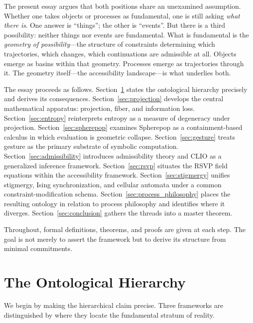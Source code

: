 \documentclass[12pt, a4paper, twoside]{article}
\theoremstyle{plain}
\theoremstyle{definition}
\theoremstyle{remark}
\begin{document}
The present essay argues that both positions share an unexamined assumption.
Whether one takes objects or processes as fundamental, one is still asking
\emph{what there is}. One answer is ``things''; the other is ``events''. But
there is a third possibility: neither things nor events are fundamental. What
is fundamental is the \emph{geometry of possibility}---the structure of
constraints determining which trajectories, which changes, which continuations
are admissible at all. Objects emerge as basins within that geometry. Processes
emerge as trajectories through it. The geometry itself---the accessibility
landscape---is what underlies both.

The essay proceeds as follows. Section~\ref{sec:ontological_hierarchy} states
the ontological hierarchy precisely and derives its consequences.
Section~\ref{sec:projection} develops the central mathematical apparatus:
projection, fiber, and information loss.
Section~\ref{sec:entropy} reinterprets entropy as a measure of degeneracy
under projection. Section~\ref{sec:spherepop} examines Spherepop as a
containment-based calculus in which evaluation is geometric collapse.
Section~\ref{sec:gesture} treats gesture as the primary substrate of symbolic
computation. Section~\ref{sec:admissibility} introduces admissibility theory
and CLIO as a generalized inference framework.
Section~\ref{sec:rsvp} situates the RSVP field equations within the
accessibility framework. Section~\ref{sec:stigmergy} unifies stigmergy, Ising
synchronization, and cellular automata under a common constraint-modification
schema. Section~\ref{sec:process_philosophy} places the resulting ontology in
relation to process philosophy and identifies where it diverges.
Section~\ref{sec:conclusion} gathers the threads into a master theorem.

Throughout, formal definitions, theorems, and proofs are given at each step.
The goal is not merely to assert the framework but to derive its structure from
minimal commitments.

\section{The Ontological Hierarchy}
\label{sec:ontological_hierarchy}

We begin by making the hierarchical claim precise. Three frameworks are
distinguished by where they locate the fundamental stratum of reality.
\end{document}
